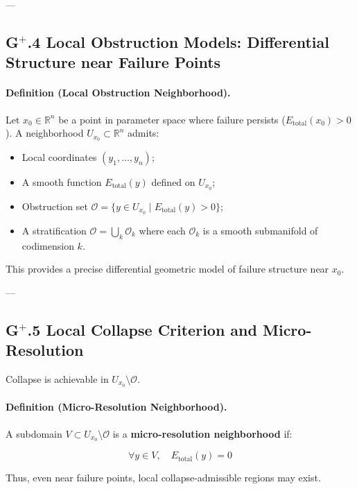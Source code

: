 \documentclass[11pt]{article}
\begin{document}
---

\subsection*{G$^{+}$.4 Local Obstruction Models: Differential Structure near Failure Points}

\paragraph{Definition (Local Obstruction Neighborhood).}

Let $x_0 \in \mathbb{R}^n$ be a point in parameter space where failure persists ($E_{\mathrm{total}}(x_0) > 0$).  
A neighborhood $U_{x_0} \subset \mathbb{R}^n$ admits:

\begin{itemize}
    \item Local coordinates $(y_1, \ldots, y_n)$;
    \item A smooth function $E_{\mathrm{total}}(y)$ defined on $U_{x_0}$;
    \item Obstruction set $\mathcal{O} = \{ y \in U_{x_0} \mid E_{\mathrm{total}}(y) > 0 \}$;
    \item A stratification $\mathcal{O} = \bigcup_{k} \mathcal{O}_k$ where each $\mathcal{O}_k$ is a smooth submanifold of codimension $k$.
\end{itemize}

This provides a precise differential geometric model of failure structure near $x_0$.

---

\subsection*{G$^{+}$.5 Local Collapse Criterion and Micro-Resolution}

Collapse is achievable in $U_{x_0} \setminus \mathcal{O}$.

\paragraph{Definition (Micro-Resolution Neighborhood).}

A subdomain $V \subset U_{x_0} \setminus \mathcal{O}$ is a \textbf{micro-resolution neighborhood} if:

\[
\forall y \in V, \quad E_{\mathrm{total}}(y) = 0
\]

Thus, even near failure points, local collapse-admissible regions may exist.
\end{document}
